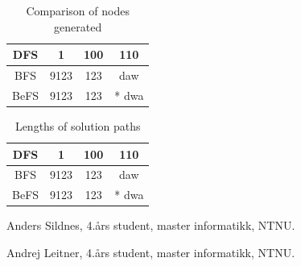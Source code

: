 \documentclass[journal]{IEEEtran}
\begin{document}
%

%
\begin{table}[!t]
\renewcommand{\arraystretch}{1.3}
\caption{Comparison of nodes generated}
\label{table_example}
\centering
\begin{tabular}{|c|ccc|}
\hline
DFS & 1 & 100 & 110 \\
\hline
BFS & 9123 & 123 & daw \\
\hline
BeFS & 9123 & 123 &* dwa \\
\hline
\end{tabular}
\end{table}

\begin{table}[!t]
\renewcommand{\arraystretch}{1.3}
\caption{Lengths of solution paths}
\label{table_example}
\centering
\begin{tabular}{|c|ccc|}
\hline
DFS & 1 & 100 & 110 \\
\hline
BFS & 9123 & 123 & daw \\
\hline
BeFS & 9123 & 123 &* dwa \\
\hline
\end{tabular}
\end{table}


\begin{IEEEbiographynophoto}{Anders Sildnes,}
    4.års student, master informatikk, NTNU.\
\end{IEEEbiographynophoto}
\begin{IEEEbiographynophoto}{Andrej Leitner,}
    4.års student, master informatikk, NTNU.\
\end{IEEEbiographynophoto}
\end{document}
